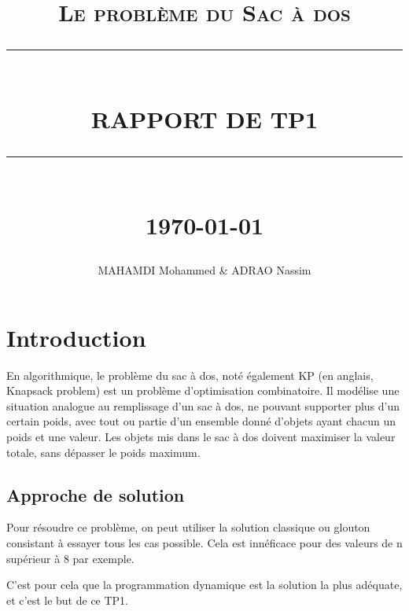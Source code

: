 \documentclass[12pt]{report}
\newcommand{\HRule}[1]{\rule{\linewidth}{#1}}
\begin{document}
	\renewcommand{\contentsname}{Table des Matières}
\renewcommand{\listfigurename}{Table des Figures}

	\author{MAHAMDI Mohammed & ADRAO Nassim}        
	\date{} 
	\title{  \textsc{ Le problème du Sac à dos}
		\\ [2.0cm]
		\HRule{0.5pt} \\
		\LARGE \textbf{\uppercase{Rapport de TP1 }}
		\HRule{2pt} \\ [0.5cm]
		\normalsize \today \vspace*{5\baselineskip}}
	\maketitle
	\tableofcontents
\newpage
\listoffigures 
	\newpage
	\sectionfont{\scshape}
	
	\chapter{Introduction}
	 En algorithmique, le problème du sac à dos, noté également KP (en anglais, Knapsack problem) est un problème d'optimisation combinatoire. Il modélise une situation analogue au remplissage d'un sac à dos, ne pouvant supporter plus d'un certain poids, avec tout ou partie d'un ensemble donné d'objets ayant chacun un poids et une valeur. Les objets mis dans le sac à dos doivent maximiser la valeur totale, sans dépasser le poids maximum.
	\section{Approche de solution}
\par{}
	Pour résoudre ce problème, on peut utiliser la solution classique ou glouton consistant à essayer tous les cas possible. Cela est innéficace pour des valeurs de n supérieur à 8 par exemple.
\par{}
	C'est pour cela que la programmation dynamique est la solution la plus adéquate, et c'est le but de ce TP1.
	
\end{document}
